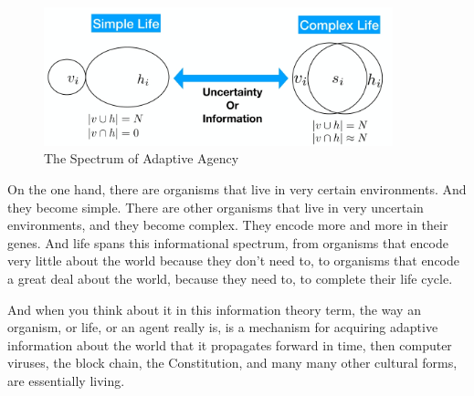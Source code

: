 \documentclass[]{article}
\begin{document}
\begin{figure}[H]
	\caption{The Spectrum of Adaptive Agency}\label{fig:SpectrumOfLife}
	\includegraphics[width=0.9\textwidth]{SpectrumOfLife}
\end{figure}

 On the one hand,
there are organisms that live in very
certain environments. And they become
simple. There are other organisms
that live in very uncertain environments,
and they become complex. They encode
more and more in their genes. And life
spans this informational spectrum, from
organisms that encode very little about
the world because they don't need to,
to organisms that encode a great deal
about the world, because they need to,
to complete their life cycle.

And when you think about it in this
information theory term,
the way an organism, or life,
or an agent really is,
is a mechanism for acquiring adaptive
information about the world that it
propagates forward in time, then
computer viruses, the block chain,
the Constitution, and many many other
cultural forms, are essentially living.
\end{document}
